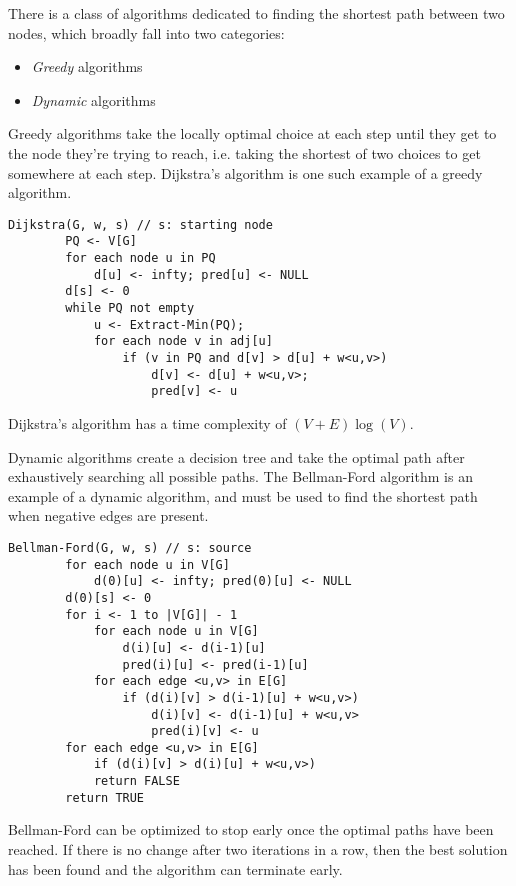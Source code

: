 There is a class of algorithms dedicated to finding the shortest
path between two nodes, which broadly fall into two categories:
\begin{itemize}
    \item \emph{Greedy} algorithms
    \item \emph{Dynamic} algorithms
\end{itemize}
Greedy algorithms take the locally optimal choice at each step until they get to the
node they're trying to reach, i.e. taking the shortest of two choices to get somewhere
at each step. Dijkstra's algorithm is one such example of a greedy algorithm.
\begin{lstlisting}[caption={Dijkstra's algorithm}]
    Dijkstra(G, w, s) // s: starting node
        PQ <- V[G]
        for each node u in PQ
            d[u] <- infty; pred[u] <- NULL
        d[s] <- 0
        while PQ not empty
            u <- Extract-Min(PQ);
            for each node v in adj[u]
                if (v in PQ and d[v] > d[u] + w<u,v>)
                    d[v] <- d[u] + w<u,v>;
                    pred[v] <- u
\end{lstlisting}
Dijkstra's algorithm has a time complexity of $(V + E)\log(V)$.

Dynamic algorithms create a decision tree and take the optimal path after exhaustively
searching all possible paths. The Bellman-Ford algorithm is an example of a dynamic
algorithm, and must be used to find the shortest path when negative edges are present.
\begin{lstlisting}[caption={Bellman-Ford algorithm}]
    Bellman-Ford(G, w, s) // s: source
        for each node u in V[G]
            d(0)[u] <- infty; pred(0)[u] <- NULL
        d(0)[s] <- 0
        for i <- 1 to |V[G]| - 1
            for each node u in V[G]
                d(i)[u] <- d(i-1)[u]
                pred(i)[u] <- pred(i-1)[u]
            for each edge <u,v> in E[G]
                if (d(i)[v] > d(i-1)[u] + w<u,v>)
                    d(i)[v] <- d(i-1)[u] + w<u,v>
                    pred(i)[v] <- u
        for each edge <u,v> in E[G]
            if (d(i)[v] > d(i)[u] + w<u,v>)
            return FALSE
        return TRUE
\end{lstlisting}
Bellman-Ford can be optimized to stop early once the optimal paths have
been reached. If there is no change after two iterations in a row, then
the best solution has been found and the algorithm can terminate early.